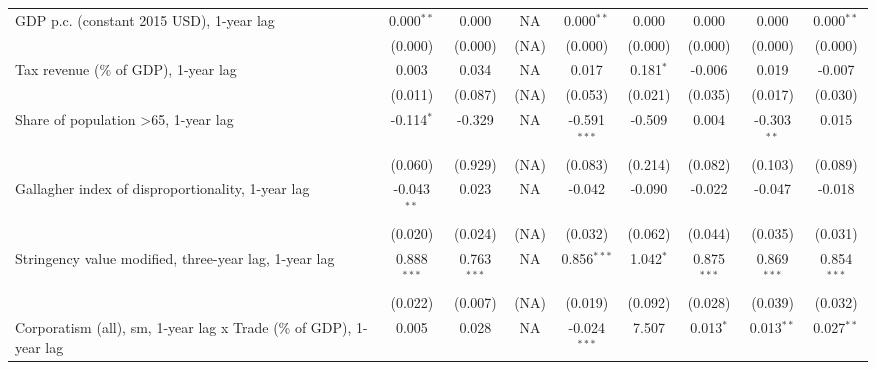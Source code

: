 \begin{table}[htbp]
\begin{tabular}{lcccccccc}
      GDP p.c. (constant 2015 USD), 1-year lag                           & 0.000$^{**}$  & 0.000                     & NA           & 0.000$^{**}$   & 0.000            & 0.000           & 0.000           & 0.000$^{**}$\\   
                                                                         & (0.000)       & (0.000)                   & (NA)         & (0.000)        & (0.000)          & (0.000)         & (0.000)         & (0.000)\\   
      Tax revenue (\% of GDP), 1-year lag                                & 0.003         & 0.034                     & NA           & 0.017          & 0.181$^{*}$      & -0.006          & 0.019           & -0.007\\   
                                                                         & (0.011)       & (0.087)                   & (NA)         & (0.053)        & (0.021)          & (0.035)         & (0.017)         & (0.030)\\   
      Share of population >65, 1-year lag                                & -0.114$^{*}$  & -0.329                    & NA           & -0.591$^{***}$ & -0.509           & 0.004           & -0.303$^{**}$   & 0.015\\   
                                                                         & (0.060)       & (0.929)                   & (NA)         & (0.083)        & (0.214)          & (0.082)         & (0.103)         & (0.089)\\   
      Gallagher index of disproportionality, 1-year lag                  & -0.043$^{**}$ & 0.023                     & NA           & -0.042         & -0.090           & -0.022          & -0.047          & -0.018\\   
                                                                         & (0.020)       & (0.024)                   & (NA)         & (0.032)        & (0.062)          & (0.044)         & (0.035)         & (0.031)\\   
      Stringency value modified, three-year lag, 1-year lag              & 0.888$^{***}$ & 0.763$^{***}$             & NA           & 0.856$^{***}$  & 1.042$^{*}$      & 0.875$^{***}$   & 0.869$^{***}$   & 0.854$^{***}$\\   
                                                                         & (0.022)       & (0.007)                   & (NA)         & (0.019)        & (0.092)          & (0.028)         & (0.039)         & (0.032)\\   
      Corporatism (all), sm, 1-year lag x Trade (\% of GDP), 1-year lag  & 0.005         & 0.028                     & NA           & -0.024$^{***}$ & 7.507            & 0.013$^{*}$     & 0.013$^{**}$    & 0.027$^{**}$\\   

\end{tabular}
\end{table}
